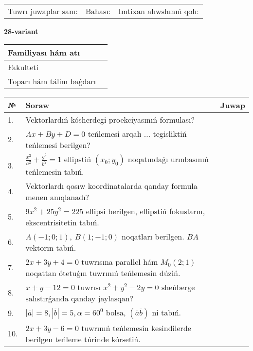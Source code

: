 \documentclass{article}
\begin{document}
\vspace{1cm}

\begin{tabular}{lll}
Tuwrı juwaplar sanı: \underline{\hspace{1.5cm}} & 
Bahası: \underline{\hspace{1.5cm}} & 
Imtixan alıwshınıń qolı: \underline{\hspace{2cm}} \\
\end{tabular}

\egroup

\newpage


\textbf{28-variant}\\

\bgroup
\def\arraystretch{1.6} %

\begin{tabular}{|m{5.7cm}|m{9.5cm}|}
\hline
Familiyası hám atı & \\
\hline
Fakulteti  & \\
\hline
Toparı hám tálim baǵdarı  & \\
\hline
\end{tabular}

\vspace{1cm}

\begin{tabular}{|m{0.7cm}|m{10cm}|m{4cm}|}
\hline
№ & Soraw & Juwap \\
\hline
1. & Vektorlardıń kósherdegi proekciyasınıń formulası? &  \\
\hline
2. & $Ax+By+D=0$ teńlemesi arqalı ... tegisliktiń teńlemesi berilgen? &  \\
\hline
3. & $\frac{x^2}{a^2}+\frac{y^2}{b^2}=1$ ellipstiń $(x_0;y_0)$ noqatındaǵı urınbasınıń teńlemesin tabıń. &  \\
\hline
4. & Vektorlardı qosıw koordinatalarda qanday formula menen anıqlanadı? &  \\
\hline
5. & $9x^{2}+25y^{2}=225$ ellipsi berilgen, ellipstiń fokusların, ekscentrisitetin tabıń. &  \\
\hline
6. & $A (-1;0;1),\ B (1;-1;0)$ noqatları berilgen. $\overline{BA}$ vektorın tabıń. &  \\
\hline
7. & $2x+3y+4=0$ tuwrısına parallel hám $M_{0} (2;1)$ noqattan ótetuǵın tuwrınıń teńlemesin dúziń. &  \\
\hline
8. & $x+y-12=0$ tuwrısı $x^{2}+y^{2}-2y=0$ sheńberge salıstırǵanda qanday jaylasqan? &  \\
\hline
9. & $\left| \overline{a} \right|=8, \left| \overline{b} \right|=5, \alpha=60^{0}$ bolsa, $( \overline{a}\overline{b} )$ ni tabıń. &  \\
\hline
10. & $2x+3y-6=0$ tuwrınıń teńlemesin kesindilerde berilgen teńleme túrinde kórsetiń. &  \\
\hline
\end{tabular}
\end{document}
